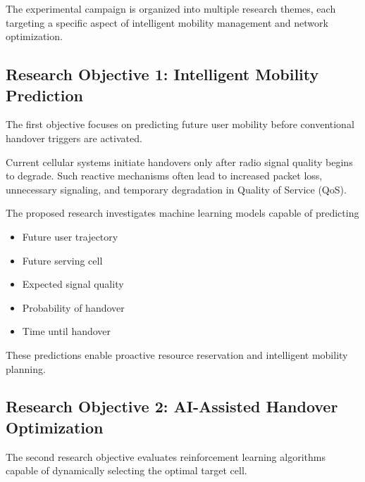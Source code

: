 \documentclass[12pt,a4paper]{article}\usepackage[a4paper,margin=1in]{geometry}\usepackage{graphicx}\usepackage{longtable}\usepackage{booktabs}\usepackage{hyperref}\usepackage{enumitem}\usepackage{amsmath}\usepackage{tikz}\usepackage{pgfgantt}\usepackage{setspace}\setstretch{1.15}\usetikzlibrary{positioning,arrows.meta,shapes.geometric}
\begin{document}
	The experimental campaign is organized into multiple research themes, each targeting a specific aspect of intelligent mobility management and network optimization.
	
	
	\subsection{Research Objective 1: Intelligent Mobility Prediction}
	
	The first objective focuses on predicting future user mobility before conventional handover triggers are activated.
	
	Current cellular systems initiate handovers only after radio signal quality begins to degrade. Such reactive mechanisms often lead to increased packet loss, unnecessary signaling, and temporary degradation in Quality of Service (QoS).
	
	The proposed research investigates machine learning models capable of predicting
	
	\begin{itemize}
		
		\item Future user trajectory
		
		\item Future serving cell
		
		\item Expected signal quality
		
		\item Probability of handover
		
		\item Time until handover
		
	\end{itemize}
	
	These predictions enable proactive resource reservation and intelligent mobility planning.
	
	
	\subsection{Research Objective 2: AI-Assisted Handover Optimization}
	
	The second research objective evaluates reinforcement learning algorithms capable of dynamically selecting the optimal target cell.
	
\end{document}
